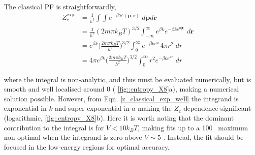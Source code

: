 \documentclass[../main.tex]{subfiles}
\begin{document}
The classical PF is straightforwardly,
\begin{equation}
\begin{aligned}
Z_c^\text{exp} &= \frac{1}{h^3}\int\int e^{-\beta \mathcal{H}(\boldsymbol{p}, \boldsymbol{r})} \; d\boldsymbol{p} d\boldsymbol{r} \\
&=  \frac{1}{h^3} (2m\pi k_B T)^{3/2}  \int_{-\infty}^\infty e^{\beta k}e^{-\beta k e^{a|\boldsymbol{r}|}} \;  d\boldsymbol{r} \\
&=   e^{\beta k}{\Big (} \frac{2m\pi k_B T}{h^2} {\Big )}^{3/2}  \int_{0}^\infty e^{-\beta k e^{a{r}}} 4\pi r^2\;  d{r} \\
&=  4\pi  e^{\beta k}{\Big (} \frac{2m\pi k_B T}{h^2} {\Big )}^{3/2}  \int_{0}^\infty r^2 e^{-\beta k e^{a{r}}} \;  d{r}
\end{aligned}
\label{z_classical_exp_well}
\end{equation}

where the integral is non-analytic, and thus must be evaluated numerically, but is smooth and well localised around 0 (\figurename{ \ref{fig::entropy_X8}}a), making a numerical solution possible. However, from Eqn. \eqref{z_classical_exp_well} the integrand is exponential in $k$ and super-exponential in $a$ making the $Z_c$ dependence significant (logarithmic, \figurename{ \ref{fig::entropy_X8}}b). Here it is worth noting that the dominant contribution to the integral is for $V < 10k_B T$, making fits up to a 100 \kcal $\,$ maximum non-optimal when the integrand is zero above $V \sim 5$ \kcal. Instead, the fit should be focused in the low-energy regions for optimal accuracy.
\end{document}
